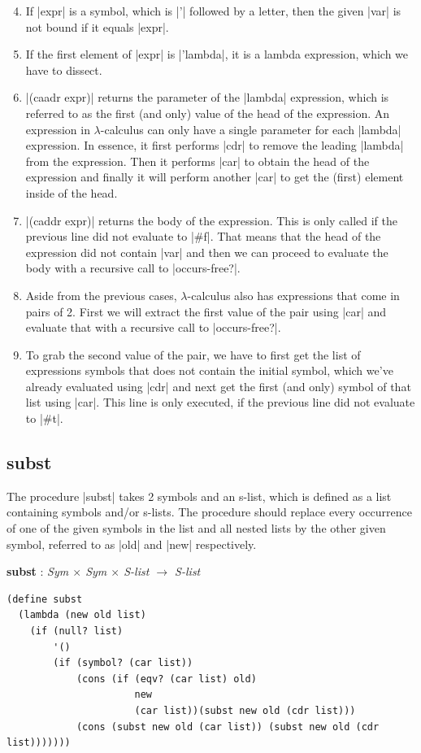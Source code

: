 \documentclass[a4paper]{article}
\begin{document}
\begin{enumerate}
\setcounter{enumi}{3}
\item If |expr| is a symbol, which is |'| followed by a letter, then the given |var| is not bound if it equals |expr|.
\item If the first element of |expr| is |'lambda|, it is a lambda expression, which we have to dissect.
\setcounter{enumi}{6}
\item |(caadr expr)| returns the parameter of the |lambda| expression, which is referred to as the first (and only) value of the head of the expression. An expression in $\lambda$-calculus can only have a single parameter for each |lambda| expression. In essence, it first performs |cdr| to remove the leading |lambda| from the expression. Then it performs |car| to obtain the head of the expression and finally it will perform another |car| to get the (first) element inside of the head.
\item |(caddr expr)| returns the body of the expression. This is only called if the previous line did not evaluate to |#f|. That means that the head of the expression did not contain |var| and then we can proceed to evaluate the body with a recursive call to |occurs-free?|.
\setcounter{enumi}{10}
\item Aside from the previous cases, $\lambda$-calculus also has expressions that come in pairs of 2. First we will extract the first value of the pair using |car| and evaluate that with a recursive call to |occurs-free?|.
\item To grab the second value of the pair, we have to first get the list of expressions symbols that does not contain the initial symbol, which we've already evaluated using |cdr| and next get the first (and only) symbol of that list using |car|. This line is only executed, if the previous line did not evaluate to |#t|.
\end{enumerate}

\subsection{subst}

The procedure |subst| takes 2 symbols and an s-list, which is defined as a list containing symbols and/or s-lists. The procedure should replace every occurrence of one of the given symbols in the list and all nested lists by the other given symbol, referred to as |old| and |new| respectively.

\textbf{subst} : \textit{Sym $\times$ Sym $\times$ S-list $\rightarrow$ S-list}
\begin{lstlisting}[aboveskip=0pt]
(define subst
  (lambda (new old list)
    (if (null? list)
        '()
        (if (symbol? (car list))
            (cons (if (eqv? (car list) old)
                      new
                      (car list))(subst new old (cdr list)))
            (cons (subst new old (car list)) (subst new old (cdr list)))))))
\end{lstlisting}
\end{document}

